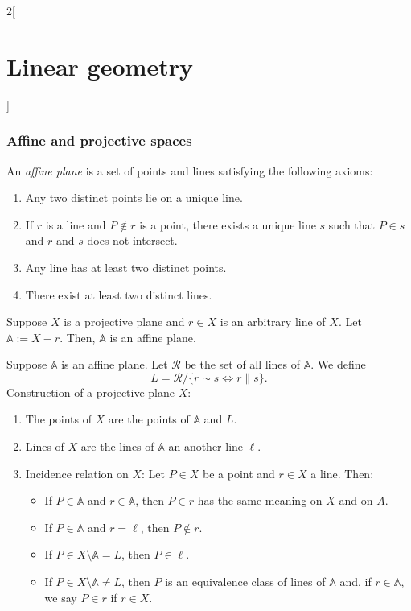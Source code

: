 \documentclass[class=article,10pt,crop=false]{standalone}
\begin{document}
\begin{multicols}{2}[\section{Linear geometry}]
\subsubsection*{Affine and projective spaces}
\begin{definition}
An \textit{affine plane} is a set of points and lines satisfying the following axioms:
\begin{enumerate}
    \item Any two distinct points lie on a unique line.
    \item If $r$ is a line and $P\notin r$ is a point, there exists a unique line $s$ such that $P\in s$ and $r$ and $s$ does not intersect.
    \item Any line has at least two distinct points.
    \item There exist at least two distinct lines.
\end{enumerate}
\end{definition}
\begin{prop}
Suppose $X$ is a projective plane and $r\in X$ is an arbitrary line of $X$. Let $\mathbb{A}:=X-r.$ Then, $\mathbb{A}$ is an affine plane.
\end{prop}
\begin{prop}
Suppose $\mathbb{A}$ is an affine plane. Let $\mathcal{R}$ be the set of all lines of $\mathbb{A}$. We define $$L=\mathcal{R}/\{r\sim s\iff r \parallel s\}.$$ Construction of a projective plane $X$:
\begin{enumerate}
    \item The points of $X$ are the points of $\mathbb{A}$ and $L$.
    \item Lines of $X$ are the lines of $\mathbb{A}$ an another line $\ell$.
    \item Incidence relation on $X$: Let $P\in X$ be a point and $r\in X$ a line. Then:
    \begin{itemize}
        \item If $P\in\mathbb{A}$ and $r\in\mathbb{A}$, then $P\in r$ has the same meaning on $X$ and on $A$.
        \item If $P\in\mathbb{A}$ and $r=\ell$, then $P\notin r$.
        \item If $P\in X\setminus\mathbb{A}=L$, then $P\in\ell$.
        \item If $P\in X\setminus\mathbb{A}\ne L$, then $P$ is an equivalence class of lines of $\mathbb{A}$ and, if $r\in\mathbb{A}$, we say $P\in r$ if $r\in X$.
    \end{itemize}
\end{enumerate}
\end{prop}

\end{multicols}
\end{document}
